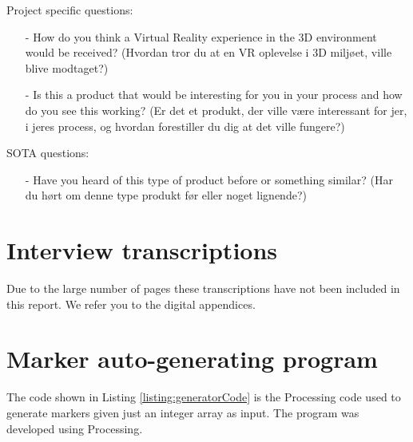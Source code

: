 Project specific questions:
\begin{itemize}
	\item[-] How do you think a Virtual Reality experience in the 3D environment would be received? (Hvordan tror du at en VR oplevelse i 3D miljøet, ville blive modtaget?)
	\item[-] Is this a product that would be interesting for you in your process and how do you see this working? (Er det et produkt, der ville være interessant for jer, i jeres process, og hvordan forestiller du dig at det ville fungere?)\\
\end{itemize}

SOTA questions:
\begin{itemize}
	\item[-] Have you heard of this type of product before or something similar? (Har du hørt om denne type produkt før eller noget lignende?)
\end{itemize}

\section*{Interview transcriptions}\label{interviewTranscriptions}
Due to the large number of pages these transcriptions have not been included in this report. We refer you to the digital appendices.
\begin{comment}




\end{comment}
\section*{Marker auto-generating program}
The code shown in Listing \ref{listing:generatorCode} is the Processing code used to generate markers given just an integer array as input. The program was developed using Processing.

